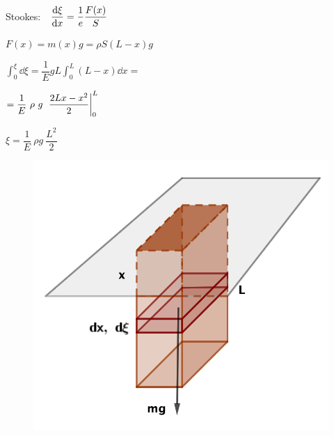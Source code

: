 \begin{multicols}{2}
Stookes: $\ \ \displaystyle \dv{\xi}{x}=\dfrac 1 e \dfrac {F(x)}{S}$

$F(x)=m(x)g=\rho S (L-x) g$

$\displaystyle \int_0^\xi \dd \xi = \dfrac 1 E g L \int_0^L (L-x) \dd x=$

$=\dfrac 1 E \ \rho \ g \ \eval{\dfrac{2Lx-x^2}{2}}_0^L$

$\xi = \dfrac 1 E \ \rho g \ \dfrac {L^2} 2$
\begin{figure}[H]
	\centering
	\includegraphics[width=.4\textwidth]{imagenes/imagenes09/T09IM09.png}
\end{figure}	
\end{multicols}


\newpage %

